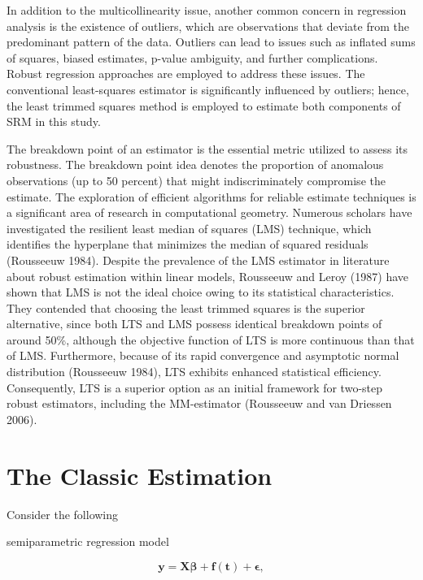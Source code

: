 \documentclass[10pt,twoside]{article}
\numberwithin{equation}{section}
\begin{document}
In addition to the multicollinearity issue, another common concern in regression analysis is the existence of outliers, which are observations that deviate from the predominant pattern of the data. Outliers can lead to issues such as inflated sums of squares, biased estimates, p-value ambiguity, and further complications. Robust regression approaches are employed to address these issues. The conventional least-squares estimator is significantly influenced by outliers; hence, the least trimmed squares method is employed to estimate both components of SRM in this study.



The breakdown point of an estimator is the essential metric utilized to assess its robustness. The breakdown point idea denotes the proportion of anomalous observations (up to 50 percent) that might indiscriminately compromise the estimate. The exploration of efficient algorithms for reliable estimate techniques is a significant area of research in computational geometry. Numerous scholars have investigated the resilient least median of squares (LMS) technique, which identifies the hyperplane that minimizes the median of squared residuals (Rousseeuw 1984). Despite the prevalence of the LMS estimator in literature about robust estimation within linear models, Rousseeuw and Leroy (1987) have shown that LMS is not the ideal choice owing to its statistical characteristics. They contended that choosing the least trimmed squares is the superior alternative, since both LTS and LMS possess identical breakdown points of around 50\%, although the objective function of LTS is more continuous than that of LMS. Furthermore, because of its rapid convergence and asymptotic normal distribution (Rousseeuw 1984), LTS exhibits enhanced statistical efficiency. Consequently, LTS is a superior option as an initial framework for two-step robust estimators, including the MM-estimator (Rousseeuw and van Driessen 2006).



\section{The Classic Estimation}

Consider the following

semiparametric regression model

\begin{equation}\label{eq21}

\boldsymbol{y}=\boldsymbol{X}\boldsymbol\beta+\boldsymbol{f}(\boldsymbol t)+\boldsymbol{\epsilon},

\end{equation}
\end{document}
